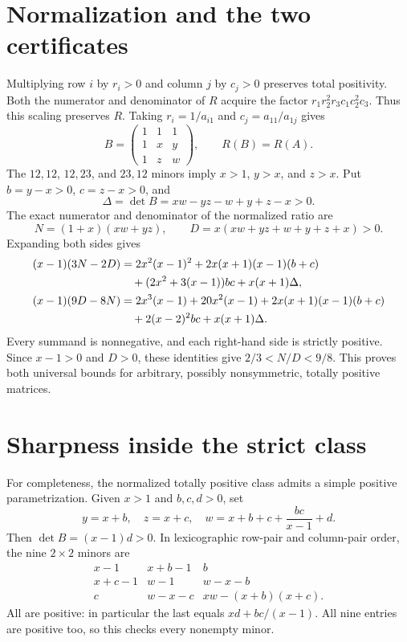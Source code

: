 \documentclass[11pt]{article}
\begin{document}
\section{Normalization and the two certificates}
Multiplying row $i$ by $r_i>0$ and column $j$ by $c_j>0$ preserves total
positivity. Both the numerator and denominator of $R$ acquire the factor
$r_1r_2^2r_3c_1c_2^2c_3$. Thus this scaling preserves $R$.
Taking $r_i=1/a_{i1}$ and $c_j=a_{11}/a_{1j}$ gives
\[
 B=\begin{pmatrix}1&1&1\\1&x&y\\1&z&w\end{pmatrix},\qquad R(B)=R(A).
\]
The $12,12$, $12,23$, and $23,12$ minors imply $x>1$, $y>x$, and $z>x$.
Put $b=y-x>0$, $c=z-x>0$, and
\[
 \Delta=\det B=xw-yz-w+y+z-x>0.
\]
The exact numerator and denominator of the normalized ratio are
\[
 N=(1+x)(xw+yz),\qquad D=x(xw+yz+w+y+z+x)>0.
\]
Expanding both sides gives
\begin{align}
(x-1)(3N-2D)
 &=2x^2(x-1)^2+2x(x+1)(x-1)(b+c)\notag\\
 &\quad +(2x^2+3(x-1))bc+x(x+1)\Delta,\label{lower}\\
(x-1)(9D-8N)
 &=2x^3(x-1)+20x^2(x-1)+2x(x+1)(x-1)(b+c)\notag\\
 &\quad +2(x-2)^2bc+x(x+1)\Delta.\label{upper}
\end{align}
Every summand is nonnegative, and each right-hand side is strictly positive.
Since $x-1>0$ and $D>0$, these identities give $2/3<N/D<9/8$.
This proves both universal bounds for arbitrary, possibly nonsymmetric,
totally positive matrices.

\section{Sharpness inside the strict class}
For completeness, the normalized totally positive class admits a simple
positive parametrization. Given $x>1$ and $b,c,d>0$, set
\[
 y=x+b,\quad z=x+c,\quad w=x+b+c+\frac{bc}{x-1}+d.
\]
Then $\det B=(x-1)d>0$. In lexicographic row-pair and column-pair order,
the nine $2\times2$ minors are
\[
\begin{array}{ccc}
 x-1&x+b-1&b\\
 x+c-1&w-1&w-x-b\\
 c&w-x-c&xw-(x+b)(x+c).
\end{array}
\]
All are positive: in particular the last equals $xd+bc/(x-1)$.
All nine entries are positive too, so this checks every nonempty minor.
\end{document}
